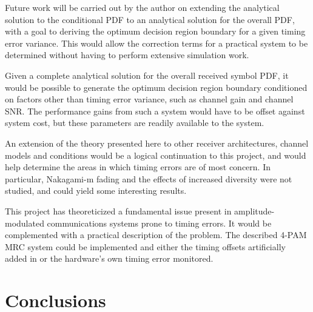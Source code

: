 Future work will be carried out by the author on extending the analytical solution to the conditional PDF to an analytical solution for the overall PDF, with a goal to deriving the optimum decision region boundary for a given timing error variance. This would allow the correction terms for a practical system to be determined without having to perform extensive simulation work.

Given a complete analytical solution for the overall received symbol PDF, it would be possible to generate the optimum decision region boundary conditioned on factors other than timing error variance, such as channel gain and channel SNR. The performance gains from such a system would have to be offset against system cost, but these parameters are readily available to the system.

An extension of the theory presented here to other receiver architectures, channel models and conditions would be a logical continuation to this project, and would help determine the areas in which timing errors are of most concern. In particular, Nakagami-m fading and the effects of increased diversity were not studied, and could yield some interesting results.

This project has theoreticized a fundamental issue present in amplitude-modulated communications systems prone to timing errors. It would be complemented with a practical description of the problem. The described 4-PAM MRC system could be implemented and either the timing offsets artificially added in or the hardware's own timing error monitored.

\chapter{Conclusions}




